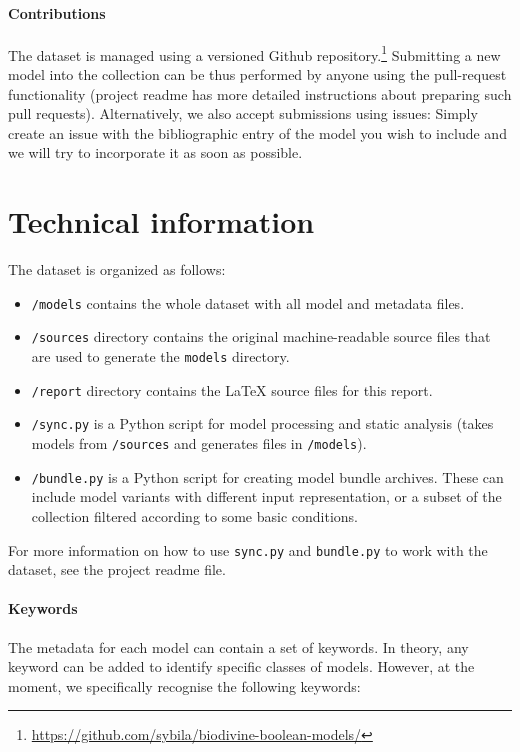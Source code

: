 \documentclass{article}
\begin{document}
\paragraph{Contributions}

The dataset is managed using a versioned Github repository.\footnote{\url{https://github.com/sybila/biodivine-boolean-models/}} Submitting a new model into the collection can be thus performed by anyone using the pull-request functionality (project readme has more detailed instructions about preparing such pull requests). Alternatively, we also accept submissions using issues: Simply create an issue with the bibliographic entry of the model you wish to include and we will try to incorporate it as soon as possible.

\section{Technical information}
\label{section:technical}

The dataset is organized as follows:

\begin{itemize}
	\item \texttt{/models} contains the whole dataset with all model and metadata files.
	\item \texttt{/sources} directory contains the original machine-readable source files that are used to generate the \texttt{models} directory.
	\item \texttt{/report} directory contains the LaTeX source files for this report.
	\item \texttt{/sync.py} is a Python script for model processing and static analysis (takes models from \texttt{/sources} and generates files in \texttt{/models}).
	\item \texttt{/bundle.py} is a Python script for creating model bundle archives. These can include model variants with different input representation, or a subset of the collection filtered according to some basic conditions.
\end{itemize}

For more information on how to use \texttt{sync.py} and \texttt{bundle.py} to work with the dataset, see the project readme file.

\paragraph{Keywords} The metadata for each model can contain a set of keywords. In theory, any keyword can be added to identify specific classes of models. However, at the moment, we specifically recognise the following keywords:
\end{document}
